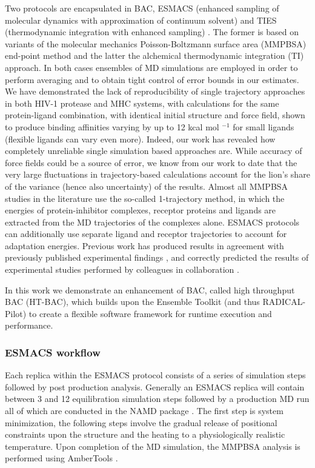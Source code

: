 Two protocols are encapsulated in BAC, ESMACS (enhanced sampling of molecular dynamics with approximation of continuum solvent) \cite{Wan2017brd4} and TIES (thermodynamic integration with enhanced sampling) \cite{Bhati2017}.
The former is based on variants of the molecular mechanics Poisson-Boltzmann surface area (MMPBSA) end-point method and the latter the alchemical thermodynamic integration (TI) approach.
In both cases ensembles of MD simulations are employed in order to perform averaging and to obtain tight control of error bounds in our estimates.
We have demonstrated the lack of reproducibility of single trajectory approaches in both HIV-1 protease and MHC systems, with calculations for the same protein-ligand combination, with identical initial structure and force field, shown to produce binding affinities varying by up to 12 kcal mol $^{-1}$ for small ligands (flexible ligands can vary even more). \cite{Wan2015, Sadiq2010, Wright2014}
Indeed, our work has revealed how completely unreliable single simulation based approaches are. 
While accuracy of force fields could be a source of error, we know from our work to date \cite{} that the very large fluctuations in trajectory-based calculations account for the lion’s share of the variance (hence also uncertainty) of the results.
Almost all MMPBSA studies in the literature use the so-called 1-trajectory method, in which the energies of protein-inhibitor complexes, receptor proteins and ligands are extracted from the MD trajectories of the complexes alone. 
ESMACS protocols can additionally use  separate ligand and receptor trajectories to account for adaptation energies. 
Previous work has produced results in agreement with previously published experimental findings \cite{Sadiq2010, Wan2011, Wright2014, Bhati2017, Wan2017brd4, Wan2017trk}, and correctly predicted the results of experimental studies performed by colleagues in collaboration \cite{Bunney2015}.

In this work we demonstrate an enhancement of BAC, called high throughput BAC (HT-BAC), which builds upon the Ensemble Toolkit (and thus RADICAL-Pilot) to create a flexible software framework for runtime execution and performance.


\subsubsection{ESMACS workflow}

Each replica within the ESMACS protocol consists of a series of simulation steps followed by post production analysis.
Generally an ESMACS replica will contain between 3 and 12 equilibration simulation steps followed by a production MD run all of which are conducted in the NAMD package \cite{Phillips2005}.
The first step is system minimization, the following steps involve the gradual release of positional constraints upon the structure and the heating to a physiologically realistic temperature.
Upon completion of the MD simulation, the MMPBSA analysis is performed using AmberTools \cite{amber14, Case2005, MillerIII2012}.



